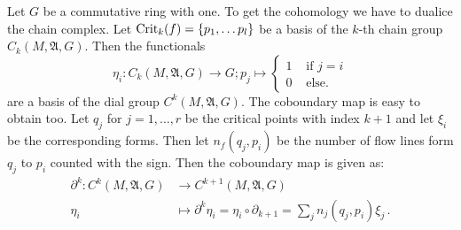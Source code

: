 \begin{definition}
Let $G$ be a commutative ring with one. To get the cohomology we have to dualice the chain complex. Let $\mathrm{Crit}_k(f)=\{p_1,\dots p_l\}$ be a basis of the $k$-th chain group $C_k(M,\mathfrak{A},G)$. Then the functionals
\begin{equation*}
	\eta_i:C_k(M,\mathfrak{A},G) \to G; p_j \mapsto \begin{cases*}
		1 & \text{ if } j=i\\
		0 & \text{ else.}
	\end{cases*}
\end{equation*} 
are a basis of the dial group $C^k(M,\mathfrak{A},G)$. The coboundary map is easy to obtain too. Let $q_j$ for $j=1,\dots,r$ be the critical points with index $k+1$ and let $\xi_i$ be the corresponding forms. Then let $n_f(q_j,p_i)$ be the number of flow lines form $q_j$ to $p_i$ counted with the sign. Then the coboundary map is given as:
\begin{align*}
	\partial^k:C^k(M,\mathfrak{A},G) & \to C^{k+1}(M,\mathfrak{A},G)\\
	\eta_i &\mapsto \partial^{k}\eta_i=\eta_i\circ \partial_{k+1}=\sum_j n_j(q_j,p_i) \xi_j \,.
\end{align*}
\end{definition}

